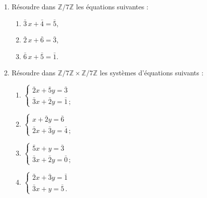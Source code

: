       \begin{exe}
            \begin{enumerate}
            \item R\'esoudre dans $\mathbb{Z}/7\mathbb{Z}$ les \'equations suivantes : 
                  \begin{enumerate}
                        \item $\bar{3}\, x + \bar{4} = \bar{5}$,
                        \item $\bar{2}\, x + \bar{6} = \bar{3}$,
                        \item $\bar{6}\, x + \bar{5} = \bar{1}$.
                  \end{enumerate}
            \item R\'esoudre dans
                  $\mathbb{Z}/7\mathbb{Z}\times \mathbb{Z}/7\mathbb{Z}$
                  les syst\`emes d'\'equations suivants :
                  \begin{enumerate}
                        \item
                              $\left\lbrace
                                    \begin{array}{l}
                                          \bar{2}x + \bar{5}y = \bar{3} \\
                                          \bar{3}x + \bar{2}y = \bar{1} \,;
                                    \end{array}
                               \right.$
                        \item
                              $\left\lbrace
                                    \begin{array}{l}
                                                  x + \bar{2}y = \bar{6} \\
                                          \bar{2}x + \bar{3}y = \bar{4} \,;
                                    \end{array}
                               \right.$
                        \item
                              $\left\lbrace
                                    \begin{array}{l}
                                          \bar{5}x +         y = \bar{3} \\
                                          \bar{3}x + \bar{2}y = \bar{0} \,;
                                    \end{array}
                               \right.$
                        \item
                              $\left\lbrace
                                    \begin{array}{l}
                                          \bar{2}x + \bar{3}y = \bar{1} \\
                                          \bar{3}x +         y = \bar{5} \,.
                                    \end{array}
                               \right.$
                  \end{enumerate}
            \end{enumerate}
      \end{exe}
